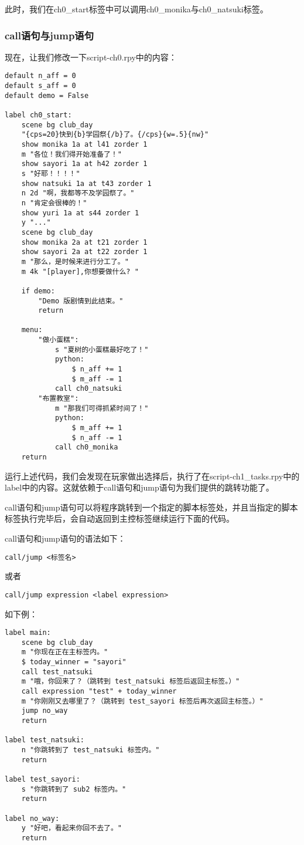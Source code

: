 此时，我们在ch0\_start标签中可以调用ch0\_monika与ch0\_natsuki标签。

\subsubsection{call语句与jump语句}

现在，让我们修改一下script-ch0.rpy中的内容：
\begin{lstlisting}[caption=script-ch0.rpy]
default n_aff = 0
default s_aff = 0
default demo = False

label ch0_start:
    scene bg club_day
    "{cps=20}快到{b}学园祭{/b}了。{/cps}{w=.5}{nw}"
    show monika 1a at l41 zorder 1
    m "各位！我们得开始准备了！"
    show sayori 1a at h42 zorder 1
    s "好耶！！！！"
    show natsuki 1a at t43 zorder 1
    n 2d "啊，我都等不及学园祭了。"
    n "肯定会很棒的！"
    show yuri 1a at s44 zorder 1
    y "..."
    scene bg club_day
    show monika 2a at t21 zorder 1
    show sayori 2a at t22 zorder 1
    m "那么，是时候来进行分工了。"
    m 4k "[player],你想要做什么? "

    if demo:
        "Demo 版剧情到此结束。"
        return

    menu:
        "做小蛋糕":
            s "夏树的小蛋糕最好吃了！"
            python:
                $ n_aff += 1
                $ m_aff -= 1
            call ch0_natsuki
        "布置教室":
            m "那我们可得抓紧时间了！"
            python:
                $ m_aff += 1
                $ n_aff -= 1
            call ch0_monika
    return
\end{lstlisting}

运行上述代码，我们会发现在玩家做出选择后，执行了在script-ch1\_tasks.rpy中的label中的内容。这就依赖于call语句和jump语句为我们提供的跳转功能了。

call语句和jump语句可以将程序跳转到一个指定的脚本标签处，并且当指定的脚本标签执行完毕后，会自动返回到主控标签继续运行下面的代码。

call语句和jump语句的语法如下：
\begin{lstlisting}
call/jump <标签名>
\end{lstlisting}

或者

\begin{lstlisting}
call/jump expression <label expression>
\end{lstlisting}

如下例：
\begin{lstlisting}
label main:
    scene bg club_day
    m "你现在正在主标签内。"
    $ today_winner = "sayori"
    call test_natsuki
    m "哦，你回来了？（跳转到 test_natsuki 标签后返回主标签。）"
    call expression "test" + today_winner
    m "你刚刚又去哪里了？（跳转到 test_sayori 标签后再次返回主标签。）"
    jump no_way
    return

label test_natsuki:
    n "你跳转到了 test_natsuki 标签内。"
    return

label test_sayori:
    s "你跳转到了 sub2 标签内。"
    return

label no_way:
    y "好吧，看起来你回不去了。"
    return
\end{lstlisting}


